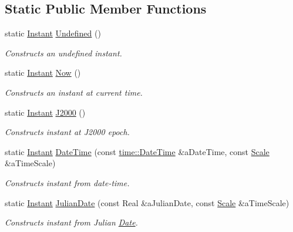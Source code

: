 \subsection*{Static Public Member Functions}
\begin{DoxyCompactItemize}
\item 
static \hyperlink{classostk_1_1physics_1_1time_1_1_instant}{Instant} \hyperlink{classostk_1_1physics_1_1time_1_1_instant_a0c95c97e9aa17863aecf8c9ebc821c0b}{Undefined} ()
\begin{DoxyCompactList}\small\item\em Constructs an undefined instant. \end{DoxyCompactList}\item 
static \hyperlink{classostk_1_1physics_1_1time_1_1_instant}{Instant} \hyperlink{classostk_1_1physics_1_1time_1_1_instant_afbc9a9219aa94e8a828f5876ee68f42c}{Now} ()
\begin{DoxyCompactList}\small\item\em Constructs an instant at current time. \end{DoxyCompactList}\item 
static \hyperlink{classostk_1_1physics_1_1time_1_1_instant}{Instant} \hyperlink{classostk_1_1physics_1_1time_1_1_instant_a3f84d0c2d0b140326d3b172b54e3ffff}{J2000} ()
\begin{DoxyCompactList}\small\item\em Constructs instant at J2000 epoch. \end{DoxyCompactList}\item 
static \hyperlink{classostk_1_1physics_1_1time_1_1_instant}{Instant} \hyperlink{classostk_1_1physics_1_1time_1_1_instant_afd5725574a02389b80fad4baff313c8a}{Date\+Time} (const \hyperlink{classostk_1_1physics_1_1time_1_1_date_time}{time\+::\+Date\+Time} \&a\+Date\+Time, const \hyperlink{namespaceostk_1_1physics_1_1time_adf23d37bd8641fb76a0e98ab46a70df7}{Scale} \&a\+Time\+Scale)
\begin{DoxyCompactList}\small\item\em Constructs instant from date-\/time. \end{DoxyCompactList}\item 
static \hyperlink{classostk_1_1physics_1_1time_1_1_instant}{Instant} \hyperlink{classostk_1_1physics_1_1time_1_1_instant_a8826d68093086f8b203a5be940ef34fb}{Julian\+Date} (const Real \&a\+Julian\+Date, const \hyperlink{namespaceostk_1_1physics_1_1time_adf23d37bd8641fb76a0e98ab46a70df7}{Scale} \&a\+Time\+Scale)
\begin{DoxyCompactList}\small\item\em Constructs instant from Julian \hyperlink{classostk_1_1physics_1_1time_1_1_date}{Date}. \end{DoxyCompactList}\item 

\end{DoxyCompactItemize}
